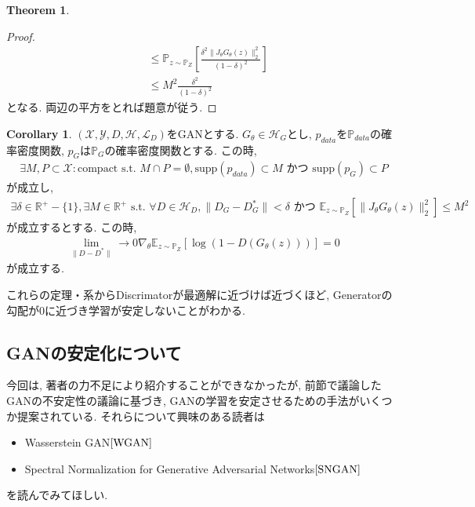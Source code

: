 \documentclass[11pt, a4paper, dvipdfmx]{jsarticle}
\theoremstyle{definition}
\newtheorem{Theorem+}[Axiom+]{Theorem}
\newtheorem{Corollary+}[Axiom+]{Corollary}
\newcommand{\R}{\mathbb{R}}
\newcommand{\X}{\mathcal{X}}
\newcommand{\Y}{\mathcal{Y}}
\newcommand{\Hil}{\mathcal{H}}
\newcommand{\Loss}{\mathcal{L}_{D}}
\newcommand{\MLsp}{(\X, \Y, D, \Hil, \Loss)}
\begin{document}
\begin{Theorem+}
\begin{proof}
\begin{align*}
                                                                                                    &\leq\mathbb{P}_{z\sim\mathbb{P}_{Z}}\left[ \frac{\delta^{2}\|J_{\theta}G_{\theta}(z)\|_{2}^{2}}{(1 - \delta)^{2}} \right]\\
                                                                                                    &\leq M^{2}\frac{\delta^{2}}{(1 - \delta)^{2}}
        \end{align*}
        となる. 両辺の平方をとれば題意が従う. 
    \end{proof}
\end{Theorem+}
\begin{Corollary+}
    $\MLsp$をGANとする. $G_{\theta}\in\Hil_{G}$とし, $p_{data}$を$\mathbb{P}_{data}$の確率密度関数, $p_{G}$は$\mathbb{P}_{G}$の確率密度関数とする. この時, 
    \begin{align*}
        \exists M, P\subset\X:\text{compact s.t. }M\cap P = \emptyset, \text{supp}(p_{data})\subset M\text{ かつ }\text{supp}(p_{G})\subset P
    \end{align*}
    が成立し, 
    \begin{align*}
        \exists\delta\in\R^{+}-\{1\}, \exists M\in\R^{+}\text{ s.t. }\forall D\in\Hil_{D}, \|D_{G} - D_{G}^{*}\| <\delta\text{ かつ }\mathbb{E}_{z\sim\mathbb{P}_{Z}}[\|J_{\theta}G_{\theta}(z)\|_{2}^{2}] \leq M^{2}
    \end{align*}
    が成立するとする. この時, 
    \begin{align*}
        \lim_{\|D - D^{*}\|}\to0\nabla_{\theta}\mathbb{E}_{z\sim\mathbb{P}_{Z}}[\log(1 - D(G_{\theta}(z)))] = 0
    \end{align*}
    が成立する. 
\end{Corollary+}
これらの定理・系からDiscrimatorが最適解に近づけば近づくほど, Generatorの勾配が0に近づき学習が安定しないことがわかる.
\subsection{GANの安定化について}
今回は, 著者の力不足により紹介することができなかったが, 前節で議論したGANの不安定性の議論に基づき, 
GANの学習を安定させるための手法がいくつか提案されている. それらについて興味のある読者は
\begin{itemize}
    \item Wasserstein GAN$\cite{WGAN}$
    \item Spectral Normalization for Generative Adversarial Networks$\cite{SNGAN}$
\end{itemize}
を読んでみてほしい. 
\end{document}
